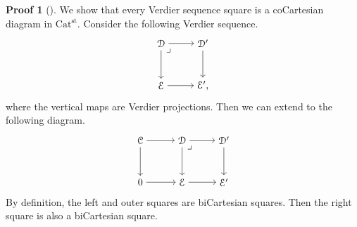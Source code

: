 \documentclass[a4paper,dvipdfmx,11pt,reqno]{amsart}
\newcommand{\C}{\mathcal{C}}
\newcommand{\D}{\mathcal{D}}
\newcommand{\E}{\mathcal{E}}
\newcommand{\Catst}{\mathrm{Cat^{st}}}
\theoremstyle{definition}
\newtheorem{newproof}[theorem]{Proof}
\begin{document}
\begin{newproof}[] \label{proof_of_Ber.rem.3.53}
  We show that every Verdier sequence square is a coCartesian diagram in $\Catst$.
  Consider the following Verdier sequence.
  \[\begin{tikzpicture}[auto,->] 
    \node (tl) at (0,1.5) {$\D$}; 
    \node (tr) at (1.5,1.5) {$\D'$};
    \node (bl) at (0,0) {$\E$}; 
    \node (br) at (1.5,0) {$\E',$}; 
    \draw (tl) -- node {} (tr); 
    \draw (bl) -- node[swap] {} (br); 
    \draw (tl) -- node[swap] {} (bl);
    \draw (tr) -- node {} (br); 
    \node at (tl.south east) {$\lrcorner$};
  \end{tikzpicture}\]
  where the vertical maps are Verdier projections. 
  Then we can extend to the following diagram.
  \[\begin{tikzpicture}[auto,->] 
    \node (tl) at (0,1.5) {$\C$};
    \node (tm) at (1.5,1.5) {$\D$}; 
    \node (tr) at (3,1.5) {$\D'$};
    \node (bl) at (0,0) {$0$}; 
    \node (bm) at (1.5,0) {$\E$};
    \node (br) at (3,0) {$\E'$}; 
    \draw (tl) -- node {} (tm); 
    \draw (tm) -- node {} (tr); 
    \draw (bl) -- node[swap] {} (bm); 
    \draw (bm) -- node[swap] {} (br); 
    \draw (tl) -- node[swap] {} (bl);
    \draw (tm) -- node {} (bm);
    \draw (tr) -- node {} (br);
    \node at (tm.south east) {$\lrcorner$};
  \end{tikzpicture}\]
  By definition, the left and outer squares are biCartesian squares.
  Then the right square is also a biCartesian square.
\end{newproof}
\end{document}
